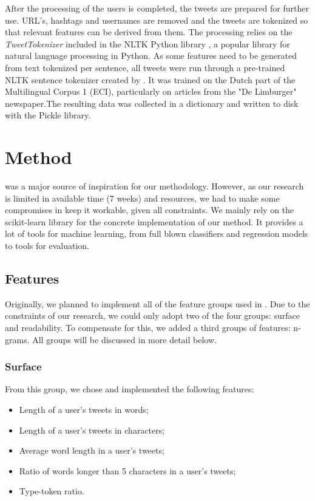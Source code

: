\documentclass[
10pt, %
a4paper, %
oneside, %
headinclude,footinclude, %
] {book}%
\begin{document}
After the processing of the users is completed, the tweets are prepared for further use. URL's, hashtags and usernames are removed and the tweets are tokenized so that relevant features can be derived from them. The processing relies on the \textit{TweetTokenizer} included in the NLTK Python library \citep{nltk}, a popular library for natural language processing in Python. As some features need to be generated from text tokenized per sentence, all tweets were run through a pre-trained NLTK sentence tokenizer created by \citet{punkt}. It was trained on the Dutch part of the Multilingual Corpus 1 (ECI), particularly on articles from the "De Limburger" newspaper.The resulting data was collected in a dictionary and written to disk with the Pickle library.


\chapter{Method}
\citet{flekova} was a major source of inspiration for our methodology. However, as our research is limited in available time (7 weeks) and resources, we had to make some compromises in keep it workable, given all constraints. We mainly rely on the scikit-learn library \citep{sklearn} for the concrete implementation of our method. It provides a lot of tools for machine learning, from full blown classifiers and regression models to tools for evaluation. 

\section{Features}
Originally, we planned to implement all of the feature groups used in \citet{flekova}. Due to the constraints of our research, we could only adopt two of the four groups: surface and readability. To compensate for this, we added a third groups of features: n-grams. All groups will be discussed in more detail below.

\subsection{Surface}
From this group, we chose and implemented the following features:
\begin{itemize}
\item Length of a user's tweets in words;
\item Length of a user's tweets in characters;
\item Average word length in a user's tweets;
\item Ratio of words longer than 5 characters in a user's tweets;
\item Type-token ratio.
\end{itemize}
\end{document}
